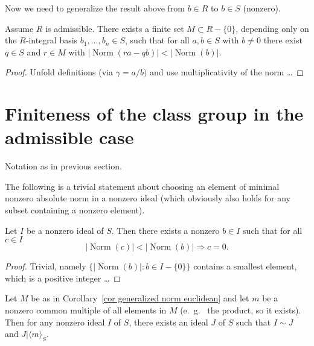 \documentclass{amsart}
\newcommand{\NN}{\operatorname{Norm}}
\begin{document}
Now we need to generalize the result above from $b \in R$ to $b \in S$ (nonzero).

\begin{corollary}\label{cor generalized norm euclidean}
Assume $R$ is admissible.
There exists a finite set $M \subset R-\{0\}$, depending only on the $R$-integral basis $b_1,\ldots,b_n \in S$, such that
for all $a, b \in S$ with $b \not=0$ there exist $q \in S$ and $r \in M$ with $|\NN(ra-qb)| < |\NN(b)|$.
\end{corollary}

\begin{proof}
Unfold definitions (via $\gamma=a/b)$ and use multiplicativity of the norm \ldots
\end{proof}



\section{Finiteness of the class group in the admissible case}

Notation as in previous section.

The following is a trivial statement about choosing an element of minimal nonzero absolute norm in a nonzero ideal (which obviously also holds for any subset containing a nonzero element).
\begin{lemma}\label{lem element of nonzero minimal norm}
Let $I$ be a nonzero ideal of $S$. Then there exists a nonzero $b \in I$ such that for all $c \in I$
\begin{equation}\label{eqn element of nonzero minimal norm}
|\NN(c)| < |\NN(b)| \Rightarrow c=0.
\end{equation}
\end{lemma}

\begin{proof}
Trivial, namely $\{|\NN(b)| : b \in I-\{0\} \}$ contains a smallest element, which is a positive integer \ldots
\end{proof}

\begin{theorem}
Let $M$ be as in Corollary~\ref{cor generalized norm euclidean} and let $m$ be a nonzero common multiple of all elements in $M$ (e.~g.~ the product, so it exists).
Then for any nonzero ideal $I$ of $S$, there exists an ideal $J$ of $S$ such that $I \sim J$ and $J | \langle m \rangle_S$.
\end{theorem}
\end{document}
